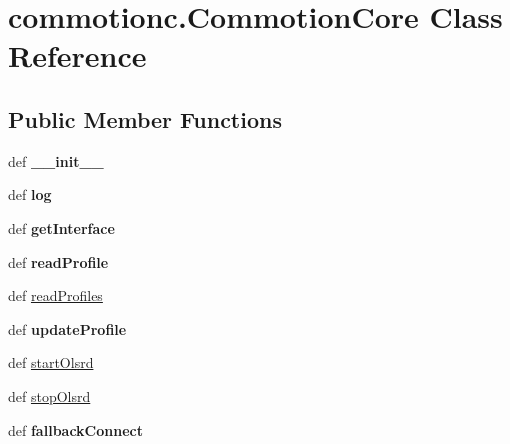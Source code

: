 \hypertarget{classcommotionc_1_1CommotionCore}{\section{commotionc.\-Commotion\-Core Class Reference}
\label{classcommotionc_1_1CommotionCore}
}
\subsection*{Public Member Functions}
\begin{DoxyCompactItemize}
\item 
\hypertarget{classcommotionc_1_1CommotionCore_acbbc49a045330bfff2f45fb873f1a4c1}{def {\bfseries \-\_\-\-\_\-init\-\_\-\-\_\-}}\label{classcommotionc_1_1CommotionCore_acbbc49a045330bfff2f45fb873f1a4c1}

\item 
\hypertarget{classcommotionc_1_1CommotionCore_adc7b8770d8f4a8a63789a96d6283677a}{def {\bfseries log}}\label{classcommotionc_1_1CommotionCore_adc7b8770d8f4a8a63789a96d6283677a}

\item 
\hypertarget{classcommotionc_1_1CommotionCore_a770e8502d6bfa8d55da17cfe55d323ba}{def {\bfseries get\-Interface}}\label{classcommotionc_1_1CommotionCore_a770e8502d6bfa8d55da17cfe55d323ba}

\item 
\hypertarget{classcommotionc_1_1CommotionCore_af1a3f2a15db27db1345473d867d84a95}{def {\bfseries read\-Profile}}\label{classcommotionc_1_1CommotionCore_af1a3f2a15db27db1345473d867d84a95}

\item 
def \hyperlink{classcommotionc_1_1CommotionCore_afeae8d932eda42d5abb9f2460d6639df}{read\-Profiles}
\item 
\hypertarget{classcommotionc_1_1CommotionCore_af2a5a24bba2a3c8ef11171e1d3b75fbd}{def {\bfseries update\-Profile}}\label{classcommotionc_1_1CommotionCore_af2a5a24bba2a3c8ef11171e1d3b75fbd}

\item 
def \hyperlink{classcommotionc_1_1CommotionCore_a902f252959889291da5f06cb591dbd35}{start\-Olsrd}
\item 
def \hyperlink{classcommotionc_1_1CommotionCore_a2cadf11999f9a99eb148957fafe80bbe}{stop\-Olsrd}
\item 
\hypertarget{classcommotionc_1_1CommotionCore_a72a52282c1aada2f4ea171df7f4dec34}{def {\bfseries fallback\-Connect}}\label{classcommotionc_1_1CommotionCore_a72a52282c1aada2f4ea171df7f4dec34}

\end{DoxyCompactItemize}
